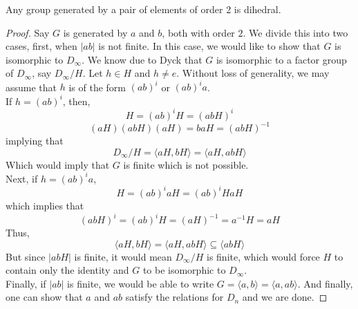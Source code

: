 \begin{proposition}
	Any group generated by a pair of elements of order 2 is dihedral.
\end{proposition}
\begin{proof}
	Say $G$ is generated by $a$ and $b$, both with order $2$. We divide this into two cases, first, when $|ab|$ is not finite. In this case, we would like to show that $G$ is isomorphic to $D_\infty$. We know due to Dyck that $G$ is isomorphic to a factor group of $D_\infty$, say $D_\infty/H$. Let $h\in H$ and $h\neq e$. Without loss of generality, we may assume that $h$ is of the form $(ab)^i$ or $(ab)^ia$. \\
	If $h = (ab)^i$, then,
	\begin{equation*}
		 H = (ab)^iH = (abH)^i
	\end{equation*}
	\begin{equation*}
		(aH)(abH)(aH) = baH = (abH)^{-1}
	\end{equation*}
	implying that
	\begin{equation*}
		D_\infty/H = \langle aH, bH\rangle = \langle aH, abH\rangle
	\end{equation*}
	Which would imply that $G$ is finite which is not possible.\\
	Next,  if $h=(ab)^ia$, 
	\begin{equation*}
		H = (ab)^iaH = (ab)^iHaH 
	\end{equation*}
	which implies that 
	\begin{equation*}
		(abH)^i = (ab)^iH = (aH)^{-1} = a^{-1}H = aH
	\end{equation*}
	Thus,
	\begin{equation*}
		\langle aH, bH\rangle = \langle aH, abH\rangle\subseteq\langle abH\rangle
	\end{equation*}
	But since $|abH|$ is finite, it would mean $D_\infty/H$ is finite, which would force $H$ to contain only the identity and $G$ to be isomorphic to $D_\infty$.\\
	Finally, if $|ab|$ is finite, we would be able to write $G = \langle a,b\rangle = \langle a, ab\rangle$. And finally, one can show that $a$ and $ab$ satisfy the relations for $D_n$ and we are done.
\end{proof}